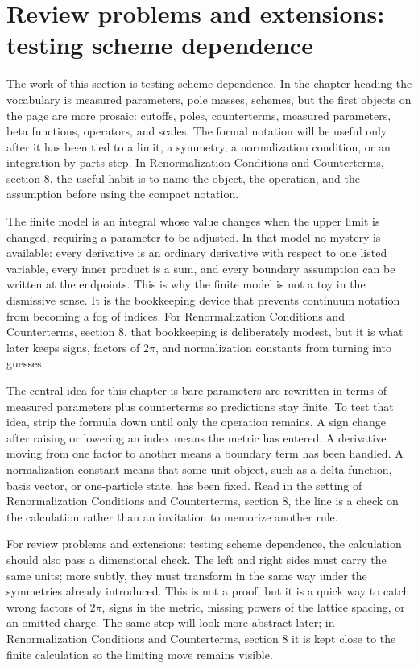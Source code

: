 \section{Review problems and extensions: testing scheme dependence}

The work of this section is testing scheme dependence.  In the chapter heading the vocabulary is measured parameters, pole masses, schemes, but the first objects on the page are more prosaic: cutoffs, poles, counterterms, measured parameters, beta functions, operators, and scales.  The formal notation will be useful only after it has been tied to a limit, a symmetry, a normalization condition, or an integration-by-parts step.  In Renormalization Conditions and Counterterms, section 8, the useful habit is to name the object, the operation, and the assumption before using the compact notation.

The finite model is an integral whose value changes when the upper limit is changed, requiring a parameter to be adjusted.  In that model no mystery is available: every derivative is an ordinary derivative with respect to one listed variable, every inner product is a sum, and every boundary assumption can be written at the endpoints.  This is why the finite model is not a toy in the dismissive sense.  It is the bookkeeping device that prevents continuum notation from becoming a fog of indices.  For Renormalization Conditions and Counterterms, section 8, that bookkeeping is deliberately modest, but it is what later keeps signs, factors of \(2\pi\), and normalization constants from turning into guesses.

The central idea for this chapter is bare parameters are rewritten in terms of measured parameters plus counterterms so predictions stay finite.  To test that idea, strip the formula down until only the operation remains.  A sign change after raising or lowering an index means the metric has entered.  A derivative moving from one factor to another means a boundary term has been handled.  A normalization constant means that some unit object, such as a delta function, basis vector, or one-particle state, has been fixed.  Read in the setting of Renormalization Conditions and Counterterms, section 8, the line is a check on the calculation rather than an invitation to memorize another rule.

For review problems and extensions: testing scheme dependence, the calculation should also pass a dimensional check.  The left and right sides must carry the same units; more subtly, they must transform in the same way under the symmetries already introduced.  This is not a proof, but it is a quick way to catch wrong factors of \(2\pi\), signs in the metric, missing powers of the lattice spacing, or an omitted charge.  The same step will look more abstract later; in Renormalization Conditions and Counterterms, section 8 it is kept close to the finite calculation so the limiting move remains visible.

